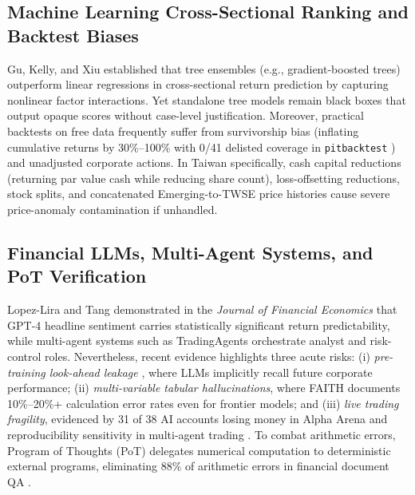 \documentclass[conference]{IEEEtran}
\begin{document}
\subsection{Machine Learning Cross-Sectional Ranking and Backtest Biases}
Gu, Kelly, and Xiu \cite{gu2020} established that tree ensembles (e.g., gradient-boosted trees) outperform linear regressions in cross-sectional return prediction by capturing nonlinear factor interactions. Yet standalone tree models remain black boxes that output opaque scores without case-level justification. Moreover, practical backtests on free data frequently suffer from survivorship bias (inflating cumulative returns by 30\%--100\% with 0/41 delisted coverage in \texttt{pitbacktest} \cite{gao2026}) and unadjusted corporate actions. In Taiwan specifically, cash capital reductions (returning par value cash while reducing share count), loss-offsetting reductions, stock splits, and concatenated Emerging-to-TWSE price histories cause severe price-anomaly contamination if unhandled.

\subsection{Financial LLMs, Multi-Agent Systems, and PoT Verification}
Lopez-Lira and Tang \cite{lopezlira2026} demonstrated in the \emph{Journal of Financial Economics} that GPT-4 headline sentiment carries statistically significant return predictability, while multi-agent systems such as TradingAgents \cite{xiao2025tradingagents} orchestrate analyst and risk-control roles. Nevertheless, recent evidence highlights three acute risks: (i) \emph{pre-training look-ahead leakage} \cite{he2025chrono, didisheim2025, gao2026}, where LLMs implicitly recall future corporate performance; (ii) \emph{multi-variable tabular hallucinations}, where FAITH \cite{faith2025} documents 10\%--20\%+ calculation error rates even for frontier models; and (iii) \emph{live trading fragility}, evidenced by 31 of 38 AI accounts losing money in Alpha Arena \cite{alphaarena2026} and reproducibility sensitivity in multi-agent trading \cite{xiao2025tradingagents}. To combat arithmetic errors, Program of Thoughts (PoT) \cite{chen2023pot} delegates numerical computation to deterministic external programs, eliminating 88\% of arithmetic errors in financial document QA \cite{agenticrag2026}.
\end{document}
